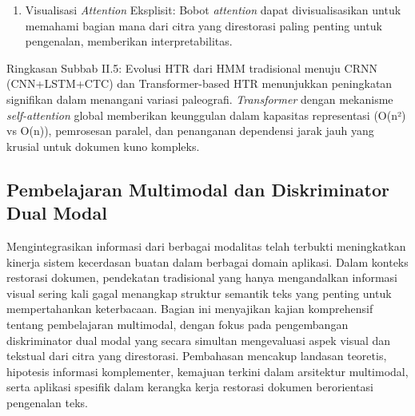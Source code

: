 \documentclass[12pt,a4paper]{article}
\begin{document}
\begin{enumerate}[leftmargin=*, labelindent=0pt, itemsep=1ex, topsep=0pt]
\begin{enumerate}[leftmargin=1.5em, labelsep=0.5em, itemindent=0pt, label=\alph*., topsep=0pt, parsep=0pt, itemsep=0pt]
      \item Visualisasi \textit{Attention} Eksplisit: \mbox{} Bobot \textit{attention} dapat divisualisasikan untuk memahami bagian mana dari citra yang direstorasi paling penting untuk pengenalan, memberikan interpretabilitas.
\end{enumerate}

\end{enumerate}

Ringkasan Subbab II.5: Evolusi HTR dari HMM tradisional menuju CRNN (CNN+LSTM+CTC) dan Transformer-based HTR menunjukkan peningkatan signifikan dalam menangani variasi paleografi. \textit{Transformer} dengan mekanisme \textit{self-attention} global memberikan keunggulan dalam kapasitas representasi (O(n²) vs O(n)), pemrosesan paralel, dan penanganan dependensi jarak jauh yang krusial untuk dokumen kuno kompleks.


\subsection{Pembelajaran Multimodal dan Diskriminator Dual Modal}
\label{subsec:multi-modal}


Mengintegrasikan informasi dari berbagai modalitas telah terbukti meningkatkan kinerja sistem kecerdasan buatan dalam berbagai domain aplikasi. Dalam konteks restorasi dokumen, pendekatan tradisional yang hanya mengandalkan informasi visual sering kali gagal menangkap struktur semantik teks yang penting untuk mempertahankan keterbacaan. Bagian ini menyajikan kajian komprehensif tentang pembelajaran multimodal, dengan fokus pada pengembangan diskriminator dual modal yang secara simultan mengevaluasi aspek visual dan tekstual dari citra yang direstorasi. Pembahasan mencakup landasan teoretis, hipotesis informasi komplementer, kemajuan terkini dalam arsitektur multimodal, serta aplikasi spesifik dalam kerangka kerja restorasi dokumen berorientasi pengenalan teks.
\end{document}
